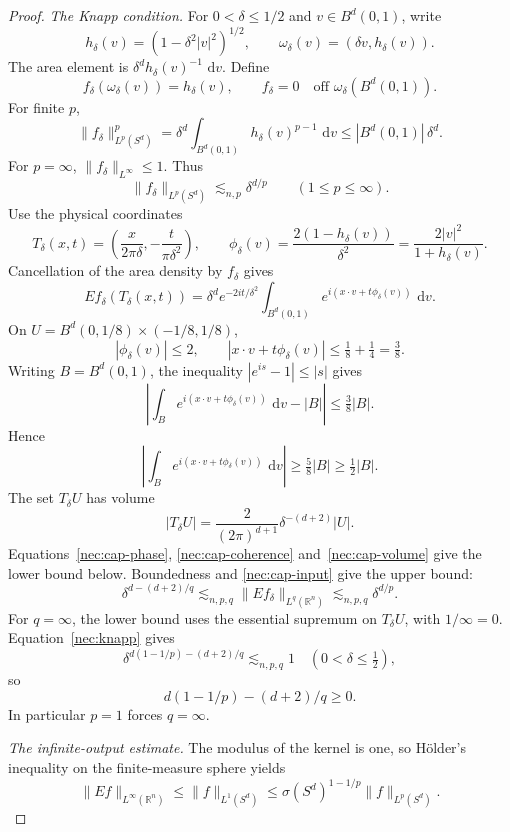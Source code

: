 \documentclass[11pt]{article}
\numberwithin{equation}{section}
\newcommand{\R}{\mathbb{R}}
\newcommand{\dd}{\,\mathrm{d}}
\newcommand{\norm}[1]{\lVert #1\rVert}
\begin{document}
\begin{proof}
\smallskip
\emph{The Knapp condition.}
For \(0<\delta\le 1/2\) and \(v\in B^d(0,1)\), write
\[
  h_\delta(v)=(1-\delta^2|v|^2)^{1/2},
  \qquad \omega_\delta(v)=(\delta v,h_\delta(v)).
\]
The area element is \(\delta^d h_\delta(v)^{-1}\,\dd v\). Define
\[
 f_\delta(\omega_\delta(v))=h_\delta(v),\qquad
 f_\delta=0\quad\text{off }\omega_\delta(B^d(0,1)).
\]
For finite \(p\),
\[
  \norm{f_\delta}_{L^p(S^d)}^p
  =\delta^d\int_{B^d(0,1)} h_\delta(v)^{p-1}\,\dd v
  \le |B^d(0,1)|\,\delta^d .
\]
For \(p=\infty\), \(\norm{f_\delta}_{L^\infty}\le1\). Thus
\begin{equation}\label{nec:cap-input}
 \norm{f_\delta}_{L^p(S^d)}\lesssim_{n,p}\delta^{d/p}
 \qquad(1\le p\le\infty).
\end{equation}
Use the physical coordinates
\[
  T_\delta(x,t)=\left(\frac{x}{2\pi\delta},
                      -\frac{t}{\pi\delta^2}\right),
  \qquad
  \phi_\delta(v)=\frac{2(1-h_\delta(v))}{\delta^2}
                =\frac{2|v|^2}{1+h_\delta(v)} .
\]
Cancellation of the area density by \(f_\delta\) gives
\begin{equation}\label{nec:cap-phase}
  Ef_\delta(T_\delta(x,t))=
  \delta^d e^{-2it/\delta^2}
  \int_{B^d(0,1)} e^{i(x\cdot v+t\phi_\delta(v))}\,\dd v .
\end{equation}
On \(U=B^d(0,1/8)\times(-1/8,1/8)\),
\[
 |\phi_\delta(v)|\le2,\qquad
 |x\cdot v+t\phi_\delta(v)|\le\tfrac18+\tfrac14=\tfrac38 .
\]
Writing \(B=B^d(0,1)\), the inequality \(|e^{is}-1|\le|s|\) gives
\[
 \left|\int_B e^{i(x\cdot v+t\phi_\delta(v))}\,\dd v-|B|\right|
 \le\tfrac38|B|.
\]
Hence
\begin{equation}\label{nec:cap-coherence}
 \left|\int_B e^{i(x\cdot v+t\phi_\delta(v))}\,\dd v\right|
 \ge\tfrac58|B|\ge\tfrac12|B|.
\end{equation}
The set \(T_\delta U\) has volume
\begin{equation}\label{nec:cap-volume}
  |T_\delta U|=\frac{2}{(2\pi)^{d+1}}\delta^{-(d+2)}|U|.
\end{equation}
Equations~\eqref{nec:cap-phase}, \eqref{nec:cap-coherence}
and~\eqref{nec:cap-volume} give the lower bound below.
Boundedness and \eqref{nec:cap-input} give the upper bound:
\begin{equation}
\label{nec:knapp}
  \delta^{d-(d+2)/q}
  \lesssim_{n,p,q} \norm{Ef_\delta}_{L^q(\R^n)}
  \lesssim_{n,p,q} \delta^{d/p} .
\end{equation}
For \(q=\infty\), the lower bound uses the essential supremum on
\(T_\delta U\), with \(1/\infty=0\). Equation~\eqref{nec:knapp} gives
\[
 \delta^{d(1-1/p)-(d+2)/q}\lesssim_{n,p,q}1
 \quad(0<\delta\le\tfrac12),
\]
so
\[
 d(1-1/p)-(d+2)/q\ge0.
\]
In particular \(p=1\) forces \(q=\infty\).

\smallskip
\emph{The infinite-output estimate.}
The modulus of the kernel is one, so H\"older's inequality on the
finite-measure sphere yields
\begin{equation}
\label{nec:infty}
  \norm{Ef}_{L^\infty(\R^n)}
  \le \norm{f}_{L^1(S^d)}
  \le \sigma(S^d)^{1-1/p}\norm{f}_{L^p(S^d)} .
\end{equation}
\end{proof}
\end{document}

